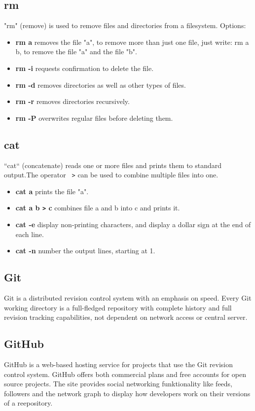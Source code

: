 \documentclass[10pt,a4paper]{scrartcl}
\begin{document}
\subsection{rm}
"rm" (remove) is used to remove files and directories from a filesystem. Options:
\begin{doublespacing}
\begin{itemize}
\item{\bf{rm a}} \qquad removes the file "a", to remove more than just one file, just write: rm a b, to remove the file "a" and the file "b".
\item{\bf{rm -i}} \qquad requests confirmation to delete the file.
\item{\bf{rm -d}} \qquad  removes directories as well as other types of
                 files.
\item{\bf{rm -r}} \qquad removes directories recursively.
\item{\bf{rm -P}} \qquad overwrites regular files before deleting them. 
\end{itemize}
\end{doublespacing}

\subsection{cat}
“cat“ (concatenate) reads one or more files and prints them to standard output.The operator \verb$ >$ can be used to combine multiple files into one.
\begin{doublespacing}
\begin{itemize}
\item{\bf{cat a}} \qquad prints the file "a".
\item{\bf{cat a b \verb$>$ c}} \qquad combines file a and b into c and prints it.
\item{\bf{cat -e}} \qquad display non-printing characters, and display
             a dollar sign at the end of each line.
\item{\bf{cat -n}} \qquad number the output lines, starting at 1.
\end{itemize}
\end{doublespacing}
\begin{singlespacing}
\section{Git}
Git is a distributed revision control system with an emphasis on speed. Every Git working directory is a full-fledged repository with complete history and full revision tracking capabilities, not dependent on network access or central server.
\subsection{GitHub}
GitHub is a web-based hosting service for projects that use the Git revision control system. GitHub offers both commercial plans and free accounts for open source projects. The site provides social networking funktionality like feeds, followers and the network graph to display how developers work on their versions of a reepository.
\end{singlespacing}
\end{document}
